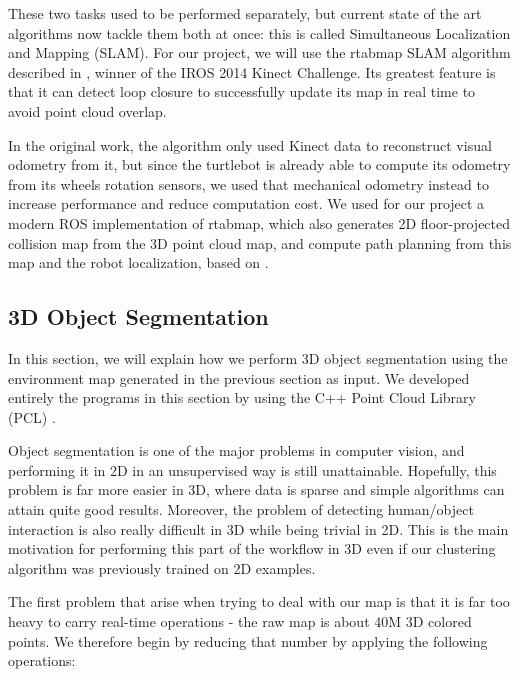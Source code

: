 These two tasks used to be performed separately, but current state of the art algorithms now tackle them both at once: this is called Simultaneous Localization and Mapping (SLAM). For our project, we will use the rtabmap SLAM algorithm described in \cite{rtabmap}, winner of the IROS 2014 Kinect Challenge. Its greatest feature is that it can detect loop closure to successfully update its map in real time to avoid point cloud overlap.

In the original work, the algorithm only used Kinect data to reconstruct visual odometry from it, but since the turtlebot is already able to compute its odometry from its wheels rotation sensors, we used that mechanical odometry instead to increase performance and reduce computation cost. We used for our project a modern ROS implementation of rtabmap, which also generates 2D floor-projected collision map from the 3D point cloud map, and compute path planning from this map and the robot localization, based on \cite{rgbd-slam}\cite{loop-closure}.

\subsection{3D Object Segmentation}
\label{section:object_seg}
In this section, we will explain how we perform 3D object segmentation using the environment map generated in the previous section as input. We developed entirely the programs in this section by using the C++ Point Cloud Library (PCL) \cite{PCL}.

Object segmentation is one of the major problems in computer vision, and performing it in 2D in an unsupervised way is still unattainable. Hopefully, this problem is far more easier in 3D, where data is sparse and simple algorithms can attain quite good results. Moreover, the problem of detecting human/object interaction is also really difficult in 3D while being trivial in 2D. This is the main motivation for performing this part of the workflow in 3D even if our clustering algorithm was previously trained on 2D examples.

The first problem that arise when trying to deal with our map is that it is far too heavy to carry real-time operations - the raw map is about 40M 3D colored points. We therefore begin by reducing that number by applying the following operations: 

